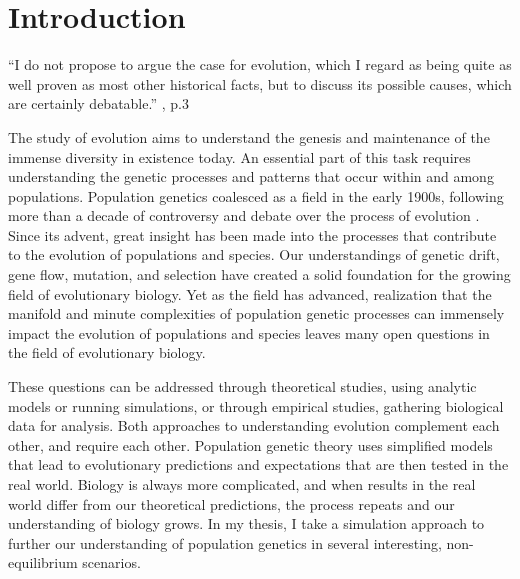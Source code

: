 \chapter{Introduction}
\label{chap:introduction}

\begin{quoteshrink}
  ``I do not propose to argue the case for evolution, which I regard as being quite as well proven as most other historical facts, but to discuss its possible causes, which are certainly debatable.''
  \hfill\citet{Haldane:1932}, p.3
\end{quoteshrink}

\noindent



The study of evolution aims to understand the genesis and maintenance of the immense diversity in existence today. An essential part of this task requires understanding the genetic processes and patterns that occur within and among populations. Population genetics coalesced as a field in the early 1900s, following more than a decade of controversy and debate over the process of evolution \citep{Provine:2001}. Since its advent, great insight has been made into the processes that contribute to the evolution of populations and species. Our understandings of genetic drift, gene flow, mutation, and selection have created a solid foundation for the growing field of evolutionary biology. Yet as the field has advanced, realization that the manifold and minute complexities of population genetic processes can immensely impact the evolution of populations and species leaves many open questions in the field of evolutionary biology.

These questions can be addressed through theoretical studies, using analytic models or running simulations, or through empirical studies, gathering biological data for analysis. Both approaches to understanding evolution complement each other, and require each other. Population genetic theory uses simplified models that lead to evolutionary predictions and expectations that are then tested in the real world. Biology is always more complicated, and when results in the real world differ from our theoretical predictions, the process repeats and our understanding of biology grows. In my thesis, I take a simulation approach to further our understanding of population genetics in several interesting, non-equilibrium scenarios.

